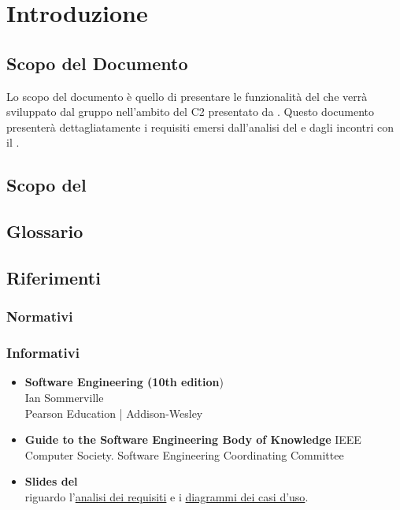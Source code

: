 \section{Introduzione}
\label{sec:Introduzione}

	\subsection{Scopo del Documento}
	\label{sub:ScopoDocumento}
	
	Lo scopo del documento è quello di presentare le funzionalità del  che verrà sviluppato dal gruppo \AUTORE{} nell'ambito del  C2 presentato da \PROPONENTE. Questo documento presenterà dettagliatamente i requisiti emersi dall'analisi del  e dagli incontri con il .
	
	\subsection{Scopo del }
	\label{sub:ScopoProdotto}
		\SCOPO
	
	\subsection{Glossario}
	\label{sub:Glossario}
		\GLOSSARIO
		
	
	\subsection{Riferimenti}
	\label{sub:Riferimenti}
		\subsubsection{Normativi}
			\NORMATIVI
		\subsubsection{Informativi}
			\begin{itemize}
				\item \textbf{Software Engineering (10th edition}) \\
				Ian Sommerville \\
				Pearson Education | Addison-Wesley
				\item \textbf{Guide to the Software Engineering Body of Knowledge}
				IEEE Computer Society. Software Engineering Coordinating Committee
				\item \textbf{Slides del \COMMITTENTE} \\ riguardo l'\href{http://www.math.unipd.it/~tullio/IS-1/2015/Dispense/L06.pdf}{analisi dei requisiti} e i \href{http://www.math.unipd.it/~tullio/IS-1/2015/Dispense/E02.pdf}{diagrammi dei casi d'uso}.
			\end{itemize}
		